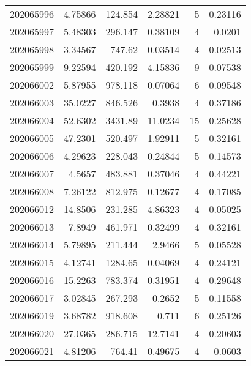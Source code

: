 \begin{tabular}{rrrrrr}
 202065996 &          4.75866 &      124.854  &            2.28821 &           5 & 0.23116 \\
 202065997 &          5.48303 &      296.147  &            0.38109 &           4 & 0.0201  \\
 202065998 &          3.34567 &      747.62   &            0.03514 &           4 & 0.02513 \\
 202065999 &          9.22594 &      420.192  &            4.15836 &           9 & 0.07538 \\
 202066002 &          5.87955 &      978.118  &            0.07064 &           6 & 0.09548 \\
 202066003 &         35.0227  &      846.526  &            0.3938  &           4 & 0.37186 \\
 202066004 &         52.6302  &     3431.89   &           11.0234  &          15 & 0.25628 \\
 202066005 &         47.2301  &      520.497  &            1.92911 &           5 & 0.32161 \\
 202066006 &          4.29623 &      228.043  &            0.24844 &           5 & 0.14573 \\
 202066007 &          4.5657  &      483.881  &            0.37046 &           4 & 0.44221 \\
 202066008 &          7.26122 &      812.975  &            0.12677 &           4 & 0.17085 \\
 202066012 &         14.8506  &      231.285  &            4.86323 &           4 & 0.05025 \\
 202066013 &          7.8949  &      461.971  &            0.32499 &           4 & 0.32161 \\
 202066014 &          5.79895 &      211.444  &            2.9466  &           5 & 0.05528 \\
 202066015 &          4.12741 &     1284.65   &            0.04069 &           4 & 0.24121 \\
 202066016 &         15.2263  &      783.374  &            0.31951 &           4 & 0.29648 \\
 202066017 &          3.02845 &      267.293  &            0.2652  &           5 & 0.11558 \\
 202066019 &          3.68782 &      918.608  &            0.711   &           6 & 0.25126 \\
 202066020 &         27.0365  &      286.715  &           12.7141  &           4 & 0.20603 \\
 202066021 &          4.81206 &      764.41   &            0.49675 &           4 & 0.0603  \\

\end{tabular}
